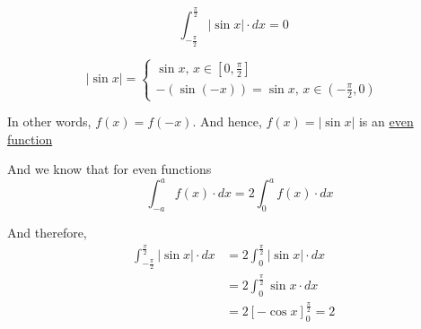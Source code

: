 \documentclass[14pt,fleqn]{extarticle}
\newcommand\intga{\int_{-\frac\pi{2}}^{\frac\pi{2}}}
\newcommand\intgb{2\int_0^{\frac\pi{2}}}
\begin{document}
 
\begin{snippet}
    
    \incorrect
    
    \[ \intga \vert\sin x\vert \cdot dx = 0 \]
    \reason
    
    \[ \vert\sin x\vert = \begin{cases} 
    \sin x, \, x\in \left[0,\frac\pi{2} \right] \\
    - \left(\sin \left(-x \right) \right) = \sin x,\, x\in \left(-\frac\pi{2},0 \right)
    \end{cases} \]
    
    In other words, $f(x) = f(-x)$. And hence, $f(x) = \vert\sin x\vert$ is an 
    \underline{even function}\newline 
    
    And we know that for even functions 
    \[ \quad \int_{-a}^a f(x)\cdot dx = 2\int_0^a f(x)\cdot dx \]
    
    And therefore, 
    \begin{align}
	\intga \vert\sin x\vert\cdot dx &= \intgb \vert\sin x\vert\cdot dx  \\
	&= \intgb \sin x\cdot dx \\
	&= 2\left[-\cos x \right]_0^{\frac\pi{2}} = 2
\end{align}
\end{snippet} 
\end{document}
